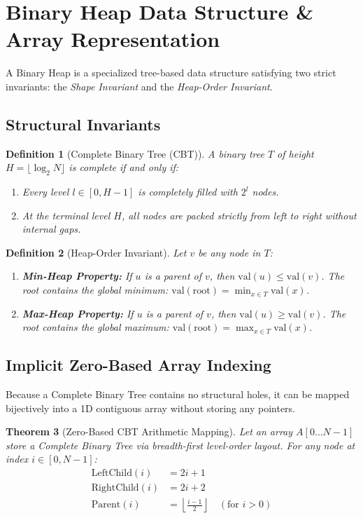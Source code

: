 \documentclass[10pt,twocolumn,letterpaper]{article}
\newtheorem{theorem}{Theorem}
\newtheorem{definition}[theorem]{Definition}
\begin{document}
\section{Binary Heap Data Structure \& Array Representation}
\label{sec:heap-structure}

A Binary Heap is a specialized tree-based data structure satisfying two strict invariants: the \emph{Shape Invariant} and the \emph{Heap-Order Invariant}.

\subsection{Structural Invariants}

\begin{definition}[Complete Binary Tree (CBT)]
A binary tree $T$ of height $H = \lfloor \log_2 N \rfloor$ is complete if and only if:
\begin{enumerate}
    \item Every level $l \in [0, H-1]$ is completely filled with $2^l$ nodes.
    \item At the terminal level $H$, all nodes are packed strictly from left to right without internal gaps.
\end{enumerate}
\end{definition}

\begin{definition}[Heap-Order Invariant]
Let $v$ be any node in $T$:
\begin{enumerate}
    \item \textbf{Min-Heap Property:} If $u$ is a parent of $v$, then $\text{val}(u) \le \text{val}(v)$. The root contains the global minimum: $\text{val}(\text{root}) = \min_{x \in T} \text{val}(x)$.
    \item \textbf{Max-Heap Property:} If $u$ is a parent of $v$, then $\text{val}(u) \ge \text{val}(v)$. The root contains the global maximum: $\text{val}(\text{root}) = \max_{x \in T} \text{val}(x)$.
\end{enumerate}
\end{definition}

\subsection{Implicit Zero-Based Array Indexing}
Because a Complete Binary Tree contains no structural holes, it can be mapped bijectively into a 1D contiguous array without storing any pointers.

\begin{theorem}[Zero-Based CBT Arithmetic Mapping]
Let an array $A[0 \dots N-1]$ store a Complete Binary Tree via breadth-first level-order layout. For any node at index $i \in [0, N-1]$:
\begin{align}
\text{LeftChild}(i) &= 2i + 1 \\
\text{RightChild}(i) &= 2i + 2 \\
\text{Parent}(i) &= \left\lfloor \frac{i - 1}{2} \right\rfloor \quad (\text{for } i > 0)
\end{align}
\end{theorem}
\end{document}
